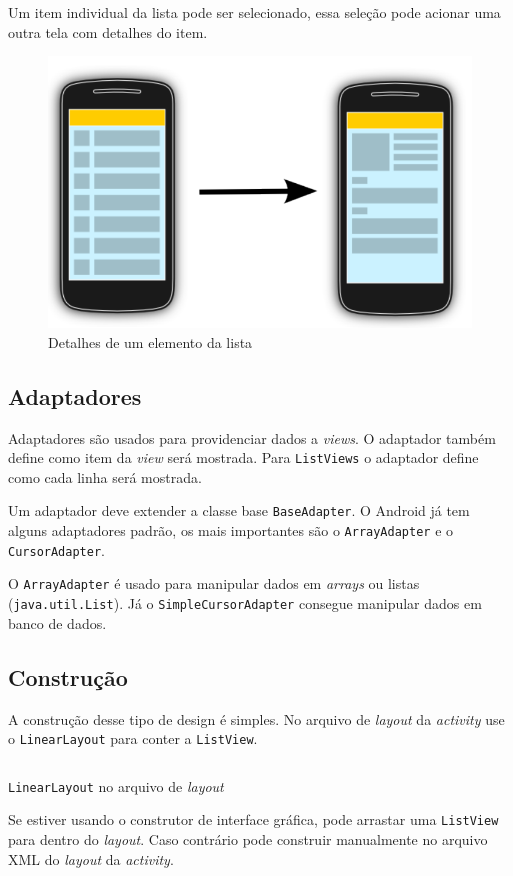 \documentclass[a4paper,12pt,brazil]{book}
\begin{document}
\begin{singlespace}
Um item individual da lista pode ser selecionado, essa seleção pode acionar uma outra tela com detalhes do item.


\begin{figure}[H]
  \centering
  \includegraphics[width=.45\textwidth]{figuras/design/listview-scheme2.png}
  \caption{Detalhes de um elemento da lista}
  \label{fig:e}
\end{figure}

\subsection{Adaptadores}
	Adaptadores são usados para providenciar dados a \emph{views}. O adaptador também define como item da \emph{view} será mostrada. Para \texttt{ListViews} o adaptador define como cada linha será mostrada.
	
	Um adaptador deve extender a classe base \texttt{BaseAdapter}. O Android já tem alguns adaptadores padrão, os mais importantes são o \texttt{ArrayAdapter} e o \texttt{CursorAdapter}. 
	
	O \texttt{ArrayAdapter} é usado para manipular dados em \emph{arrays} ou listas (\texttt{java.util.List}). Já o \texttt{SimpleCursorAdapter} consegue manipular dados em banco de dados.

\subsection{Construção}

A construção desse tipo de design é simples. No arquivo de \emph{layout} da \emph{activity} use o \texttt{LinearLayout} para conter a \texttt{ListView}.

\begin{listing}[H]
\inputminted[linenos=true,fontsize=\small,frame=lines, framesep=2mm, tabsize=2,numbersep=5pt]{xml}{src/design/layout_linear.xml}
\caption{\texttt{LinearLayout} no arquivo de \emph{layout}}
\label{code:linearlayout}
\end{listing}

Se estiver usando o construtor de interface gráfica, pode arrastar uma \texttt{ListView} para dentro do \emph{layout}. Caso contrário pode construir manualmente no arquivo XML do \emph{layout} da \emph{activity}. 


\end{singlespace}
\end{document}
